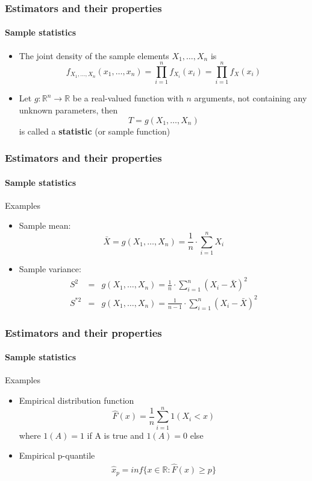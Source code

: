 \documentclass[notes=show]{beamer}
\begin{document}
\begin{frame}\frametitle{Estimators and their properties}\framesubtitle{Sample statistics}
\begin{itemize}
    \item The joint density of the sample elements $X_{1},\ldots ,X_{n}$ is
        \begin{equation*}
            f_{X_{1},\ldots ,X_{n}}(x_{1},\ldots,x_{n})=\prod_{i=1}^{n}f_{X_{i}}(x_{i})=\prod_{i=1}^{n}f_{X}(x_{i})
        \end{equation*}
    \item Let $g:\mathbb{R}^{n}\longrightarrow \mathbb{R}$ be a real-valued function with $n$ arguments, not containing any unknown parameters, then
        \begin{equation*}
            T=g(X_{1},\ldots ,X_{n})
        \end{equation*}
        is called a \textbf{statistic} (or sample function)
\end{itemize}
\end{frame}


\begin{frame}\frametitle{Estimators and their properties}\framesubtitle{Sample statistics}
Examples
\begin{itemize}
    \item Sample mean:
        \begin{equation*}
            \bar{X}=g(X_{1},\ldots ,X_{n})=\frac{1}{n}\cdot \sum_{i=1}^{n}X_{i}
        \end{equation*}
    \item Sample variance:
        \begin{eqnarray*}
            S^{2} &=&g(X_{1},\ldots ,X_{n})=\frac{1}{n}\cdot \sum_{i=1}^{n}\left( X_{i}-\bar{X}\right) ^{2} \\
            S^{\ast 2} &=&g(X_{1},\ldots ,X_{n})=\frac{1}{n-1}\cdot \sum_{i=1}^{n}\left(X_{i}-\bar{X}\right) ^{2}
        \end{eqnarray*}
\end{itemize}
\end{frame}

\begin{frame}\frametitle{Estimators and their properties}\framesubtitle{Sample statistics}
Examples
\begin{itemize}
    \item Empirical distribution function
        \begin{equation*}
            \hat{F}(x) = \frac{1}{n}\sum_{i=1}^n 1(X_i < x)
        \end{equation*}
        where $1(A)=1$ if A is true and $1(A)=0$ else
    \item Empirical p-quantile
        \begin{eqnarray*}
            \hat{x}_p = inf\{x \in \mathbb{R}:\hat{F}(x)\geq p\}
        \end{eqnarray*}
\end{itemize}
\end{frame}
\end{document}
